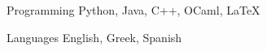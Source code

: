 

\begin{cvskills}

  \cvskill
    {Programming} %
    {Python, Java, C++, OCaml, \LaTeX} %

  \cvskill
    {Languages} %
    {English, Greek, Spanish} %

\end{cvskills}